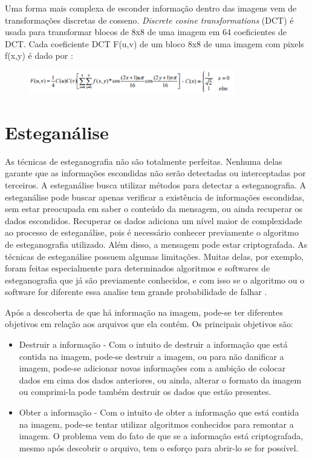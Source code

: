 \documentclass[12pt]{article}
\begin{document}
Uma forma mais complexa de esconder informação dentro das imagens vem de transformações discretas de cosseno. \textit{Discrete cosine transformations} (DCT) é usada para transformar blocos de 8x8 de uma imagem em 64 coeficientes de DCT. Cada coeficiente DCT F(u,v) de um bloco 8x8 de uma imagem com pixels f(x,y) é dado por \cite{methods}:

\begin{figure}[ht]
	\centering
	\includegraphics[width=0.8\textwidth]{formula.pdf}
\end{figure} 

\section{Esteganálise}

As técnicas de esteganografia não são totalmente perfeitas. Nenhuma delas garante que as informações escondidas não serão detectadas ou interceptadas por terceiros. A esteganálise busca utilizar métodos para detectar a esteganografia. A esteganálise pode buscar apenas verificar a existência de informações escondidas, sem estar preocupada em saber o conteúdo da mensagem, ou ainda recuperar os dados escondidos. Recuperar os dados adiciona um nível maior de complexidade ao processo de esteganálise, pois é necessário conhecer previamente o algoritmo de esteganografia utilizado. Além disso, a mensagem pode estar criptografada. As técnicas de esteganálise possuem algumas limitações. Muitas delas, por exemplo, foram feitas especialmente para determinados algoritmos e softwares de esteganografia que já são previamente conhecidos, e com isso se o algoritmo ou o software for diferente essa analise tem grande probabilidade de falhar \cite{tecnica}.

Após a descoberta de que há informação na imagem, pode-se ter diferentes objetivos em relação aos arquivos que ela contém. Os principais objetivos são:

\begin{itemize}
    \item Destruir a informação - Com o intuito de destruir a informação que está contida na imagem, pode-se destruir a imagem, ou para não danificar a imagem, pode-se adicionar novas informações com a ambição de colocar dados em cima dos dados anteriores, ou ainda, alterar o formato da imagem ou comprimi-la pode também destruir os dados que estão presentes.
    \item Obter a informação - Com o intuito de obter a informação que está contida na imagem, pode-se tentar utilizar algoritmos conhecidos para remontar a imagem. O problema vem do fato de que se a informação está criptografada, mesmo após descobrir o arquivo, tem o esforço para abrir-lo se for possível.
\end{itemize}
\end{document}
